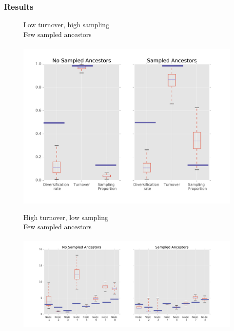 \documentclass[]{beamer}
\begin{document}
\begin{frame}
\frametitle{Results}
\begin{center}
\begin{figure}
Low turnover, high sampling  \\
Few sampled ancestors \\
\lambda   \mu   \psi   \rho \\
\includegraphics[scale=0.4]{images/HighTurnLowSamplog.png}
\end{figure}
\end{center}
\end{frame}

\begin{frame}
\begin{center}
\begin{figure}
High turnover, low sampling  \\
Few sampled ancestors \\
\lambda   \mu   \psi   \rho \\
\includegraphics[scale=0.4]{images/HighTurnHighSampnodes.png}
\end{figure}
\end{center}
\end{frame}
\end{document}
